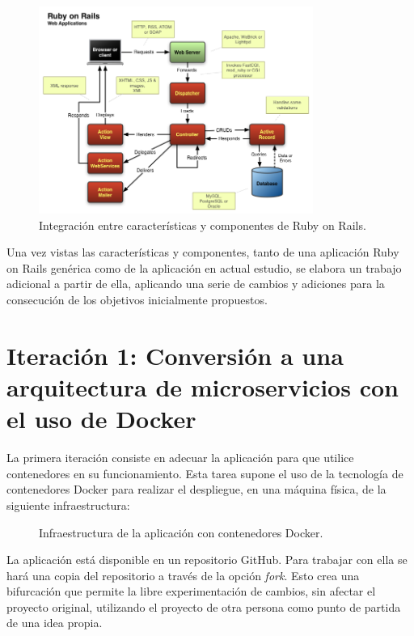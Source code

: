 \begin{figure}[H]
\centering
\includegraphics[width=0.8\textwidth]{images/figures/rubyonrails.png}
\caption{Integración entre características y componentes de Ruby on Rails.\footnotemark}
\end{figure}


Una vez vistas las características y componentes, tanto de una aplicación Ruby on Rails genérica como de la aplicación en actual estudio, se elabora un trabajo adicional a partir de ella, aplicando una serie de cambios y adiciones para la consecución de los objetivos inicialmente propuestos.

\section[Iteración 1: Arquitectura de microservicios]{Iteración 1: Conversión a una arquitectura de microservicios con el uso de Docker}

La primera iteración consiste en adecuar la aplicación para que utilice contenedores en su funcionamiento. Esta tarea supone el uso de la tecnología de contenedores Docker para realizar el despliegue, en una máquina física, de la siguiente infraestructura:

\begin{figure}[H]
\caption{Infraestructura de la aplicación con contenedores Docker.\label{fig:figure_docker_microservices}}
\end{figure}

La aplicación  está disponible en un repositorio GitHub. Para trabajar con ella se hará una copia del repositorio a través de la opción \textit{fork}. Esto crea una bifurcación que permite la libre experimentación de cambios, sin afectar el proyecto original, utilizando el proyecto de otra persona como punto de partida de una idea propia.

